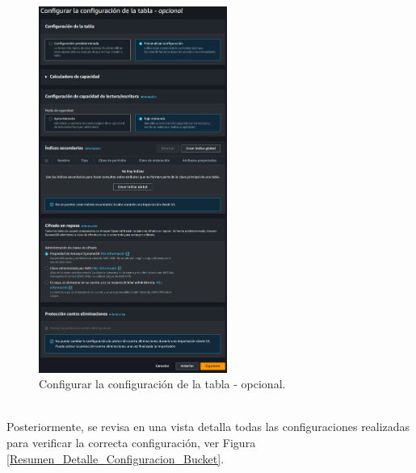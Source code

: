 \documentclass[a4paper,10pt, oneside, titlepage]{article}
\begin{document}
	\begin{figure}[!h]
		\centering
		\includegraphics[width = 1\linewidth, height = 12cm]{Configuracion_Opcional_Tabla_Bucket.png}
		\caption{Configurar la configuración de la tabla - opcional.}
		\label{Configuracion_Opcional_Tabla_Bucket}
	\end{figure} \\
	\indent Posteriormente, se revisa en una vista detalla todas las configuraciones realizadas para verificar la correcta configuración, ver Figura \ref{Resumen_Detalle_Configuracion_Bucket}. 
\end{document}

